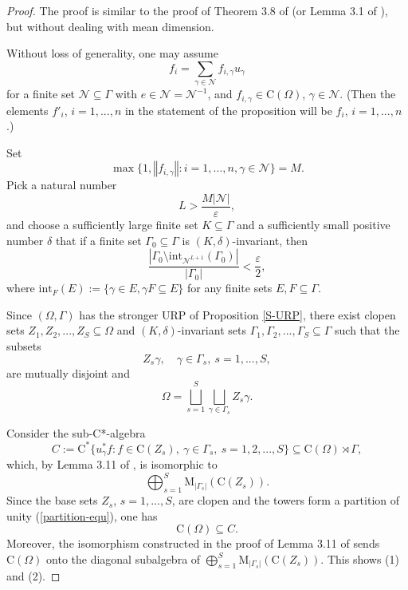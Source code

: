 \documentclass[12pt, oneside, psamsfonts]{amsart}
\theoremstyle{definition}
\theoremstyle{remark}
\numberwithin{equation}{section}
\newcommand{\norm}[1]{\left\Vert#1\right\Vert}
\newcommand{\abs}[1]{\left\vert#1\right\vert}
\newcommand{\eps}{\varepsilon}
\begin{document}
\begin{proof}

The proof is similar to the proof of Theorem 3.8 of \cite{Niu-MD-Z} (or Lemma 3.1 of \cite{Niu-MD-Z-absorbing}), but without dealing with mean dimension.

Without loss of generality, one may assume 
$$f_i=\sum_{\gamma \in\mathcal N} f_{i, \gamma}u_\gamma$$
for a finite set $\mathcal N \subseteq \Gamma$ with $e\in \mathcal N = \mathcal N^{-1}$, and $f_{i, \gamma} \in \mathrm{C}(\Omega)$, $\gamma \in \mathcal N$. (Then the elements $f'_i$, $i=1, ..., n$ in the statement of the proposition will be $f_i$, $i=1, ..., n$.)

Set
$$\max\{1, \norm{f_{i, \gamma}}: i=1, ..., n, \gamma\in\mathcal N\} = M.$$
Pick a natural number $$L > \frac{M\abs{\mathcal N}}{\eps},$$ and choose  a sufficiently large finite set $K\subseteq\Gamma$ and a sufficiently small  positive number $\delta$ that if a finite set $\Gamma_0\subseteq\Gamma$ is $(K, \delta)$-invariant, then
\begin{equation}\label{very-small-bd}
\frac{\abs{\Gamma_0 \setminus \mathrm{int}_{\mathcal N^{L+1}} (\Gamma_0)} }{\abs{\Gamma_0}} < \frac{\eps}{2},
\end{equation}
where $\mathrm{int}_F(E) := \{\gamma\in E, \gamma F \subseteq E\}$ for any finite sets $E, F \subseteq \Gamma$.



Since $(\Omega, \Gamma)$ has the stronger URP of Proposition \ref{S-URP}, there exist clopen sets $Z_1, Z_2, ..., Z_S \subseteq \Omega$ and $(K, \delta)$-invariant sets $\Gamma_1, \Gamma_2, ..., \Gamma_S \subseteq \Gamma$ such that the subsets 
$$Z_s\gamma,\quad \gamma\in \Gamma_s,\ s=1, ..., S, $$
are mutually disjoint and
\begin{equation}\label{partition-equ}
\Omega = \bigsqcup_{s=1}^S\bigsqcup_{\gamma\in \Gamma_s} Z_s\gamma.
\end{equation}

Consider the sub-C*-algebra
\begin{equation}\label{defn-C}
C:=\mathrm{C}^*\{ u^*_\gamma f: f\in\mathrm{C}(Z_s),\ \gamma\in \Gamma_s,\ s=1, 2, ..., S\}\subseteq \mathrm{C}(\Omega) \rtimes \Gamma,
\end{equation} 
which, by Lemma 3.11 of \cite{Niu-MD-Z}, is isomorphic to $$\bigoplus_{s=1}^S\mathrm{M}_{\abs{\Gamma_s}}(\mathrm{C}(Z_s)).$$
Since the base sets $Z_s$, $s=1, ..., S$, are clopen and the towers form a partition of unity (\eqref{partition-equ}), one has 
\begin{equation}\label{all-in-C}
\mathrm{C}(\Omega) \subseteq C.
\end{equation} 
Moreover, the isomorphism constructed in the proof of Lemma 3.11 of \cite{Niu-MD-Z}  sends $\mathrm{C}(\Omega)$ onto the diagonal subalgebra of $\bigoplus_{s=1}^S\mathrm{M}_{\abs{\Gamma_s}}(\mathrm{C}(Z_s))$. This shows (1) and (2).



\end{proof}
\end{document}
